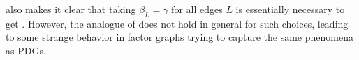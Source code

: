 \documentclass{article}
\theoremstyle{plain}
\theoremstyle{definition}
\theoremstyle{remark}
\numberwithin{equation}{section}
\begin{document}
%

 also makes it clear that 
taking $\beta_L = \gamma$ for all edges $L$ is
essentially necessary to get .
However, the analogue of  does not hold
in general for
such choices,
leading to some
strange
behavior in factor graphs trying to capture the same phenomena as PDGs.
\end{document}
